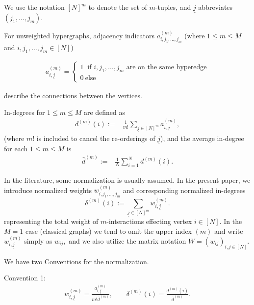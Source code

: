 \documentclass{article}
\newcommand{\ul}{\underline}
\newcommand{\1}[1]{{\mathds{1}}_{\left\{#1\right\}}}
\begin{document}
	We use the notation $[N]^m$ to denote the set of $m$-tuples, and $\ul{j}$ abbreviates $(j_1,\dots,j_{m})$.
	
	For unweighted hypergraphs, adjacency indicators $a^{(m)}_{i,j_1,\dots,j_{m}}$ (where $1\leq m\leq M$ and $i,j_1,\dots,j_{m}\in [N]$)
	
	\begin{align*}
		a_{i,\ul{j}}^{(m)} = \begin{cases}
			1 \ \text{ if $i,j_1,\dots,j_m$ are on the same hyperedge} \\
			0 \ \text{else}
		\end{cases}
	\end{align*}
	
	describe the connections between the vertices.
	
	
	In-degrees for $1\leq m\leq M$ are defined as
	\begin{align}
		\label{eq:dmi}
		d^{(m)}(i):=&\frac{1}{m!}\sum_{\underline{j} \in [N]^m} a_{i,\underline{j}}^{(m)},
	\end{align}
	(where $m!$ is included to cancel the re-orderings of $\ul{j}$), and the average in-degree for each $1\leq m\leq M$ is
	\begin{align*}
		\bar{d}^{(m)}:=& \frac{1}{N} \sum_{i=1}^{N}d^{(m)}(i).
	\end{align*}
	
	In the literature, some normalization is usually assumed. In the present paper, we introduce normalized weights $w^{(m)}_{i,j_1,\dots,j_{m}}$ and corresponding normalized in-degrees 
	$$\delta^{(m)}(i):=\sum_{\underline{j} \in [N]^m} w_{i,\underline{j}}^{(m)}.$$
	representing the total weight of $m$-interactions effecting vertex $i\in [N]$. 
	In the $M=1$ case (classical graphs) we tend to omit the upper index $(m)$ and write $w_{i,\ul{j}}^{(m)}$ simply as $w_{ij},$ and we also utilize the matrix notation $W=(w_{ij})_{i,j \in [N]}.$ 
	
	We have two Conventions for the normalization.
	
	Convention 1:
	\begin{align}
		\label{eq:conv1}
		w_{i,\underline{j}}^{(m)}=\frac{a_{i,\underline{j}}^{(m)}}{m! \bar{d}^{(m)}},\qquad \delta^{(m)}(i)=\frac{d^{(m)}(i)}{\bar{d}^{(m)}}.
	\end{align}
	
\end{document}
